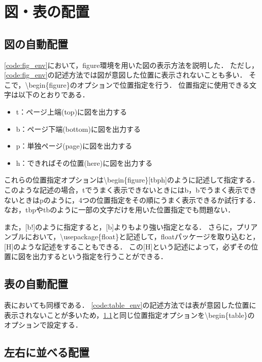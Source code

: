 \section{図・表の配置}

\subsection{図の自動配置}
\label{sec:allocate_fig}

\code\ref{code:fig_env}において，figure環境を用いた図の表示方法を説明した．
ただし，\code\ref{code:fig_env}の記述方法では図が意図した位置に表示されないことも多い．
そこで，\textbackslash begin\{figure\}のオプションで位置指定を行う．
位置指定に使用できる文字は以下のとおりである．
\begin{itemize}
  \item t：ページ上端(top)に図を出力する
  \item b：ページ下端(bottom)に図を出力する
  \item p：単独ページ(page)に図を出力する
  \item h：できればその位置(here)に図を出力する
\end{itemize}

これらの位置指定オプションは\textbackslash begin\{figure\}[tbph]のように記述して指定する．
このような記述の場合，tでうまく表示できないときにはb，bでうまく表示できないときはpのように，4つの位置指定をその順にうまく表示できるか試行する．
なお，tbpやtbのように一部の文字だけを用いた位置指定でも問題ない．

また，[b!]のように指定すると，[b]よりもより強い指定となる．
さらに，プリアンブルにおいて，\textbackslash usepackage\{float\}と記述して，floatパッケージを取り込むと，[H]のような記述をすることもできる．
この[H]という記述によって，必ずその位置に図を出力するという指定を行うことができる．

\subsection{表の自動配置}

表においても同様である．
\code\ref{code:table_env}の記述方法では表が意図した位置に表示されないことが多いため，\ref{sec:allocate_fig}と同じ位置指定オプションを\textbackslash begin\{table\}のオプションで設定する．

\subsection{左右に並べる配置}

